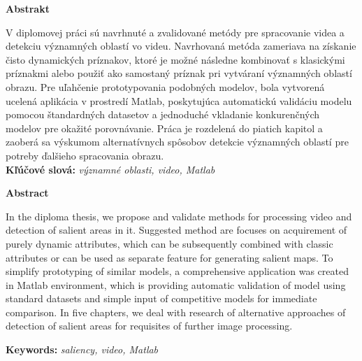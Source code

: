 {\noindent\large\bf Abstrakt}

\vspace{1.8cm}
V diplomovej práci sú navrhnuté a zvalidované metódy pre spracovanie videa a detekciu významných oblastí vo videu.
Navrhovaná metóda zameriava na získanie čisto dynamických príznakov, ktoré je možné následne kombinovať s klasickými príznakmi alebo použiť ako samostaný príznak pri vytváraní významných oblastí obrazu.
Pre uľahčenie prototypovania podobných modelov, bola vytvorená ucelená aplikácia v prostredí Matlab, poskytujúca automatickú validáciu modelu pomocou štandardných datasetov a jednoduché vkladanie konkurenčných modelov pre okažité porovnávanie.
Práca je rozdelená do piatich kapitol a zaoberá sa výskumom alternatívnych spôsobov detekcie významných oblastí pre potreby ďalšieho spracovania obrazu.
\\

{\parindent0pt \textbf{Kľúčové slová:} \emph{významné oblasti, video, Matlab}}

\newpage
 {\noindent\large\bf Abstract}
  \vspace{1.8cm}


In the diploma thesis, we propose and validate methods for processing video and detection of salient areas in it. Suggested method are focuses on acquirement of purely dynamic attributes, which can be subsequently combined with classic attributes or can be used as separate feature for generating salient maps.
To simplify prototyping of similar models, a comprehensive application was created in Matlab environment, which is providing automatic validation of model using standard datasets and simple input of competitive models for immediate comparison.
In five chapters, we deal with research of alternative approaches of detection of salient areas for requisites of further image processing.

{\parindent0pt \textbf{Keywords:} \emph{saliency, video, Matlab}}


\newpage	
